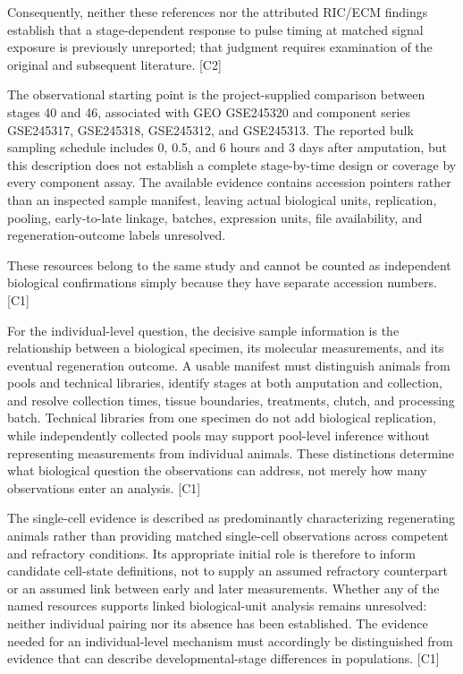 \documentclass[11pt]{article}
\begin{document}
Consequently, neither these references nor the attributed RIC/ECM findings establish that a stage-dependent response to pulse timing at matched signal exposure is previously unreported; that judgment requires examination of the original and subsequent literature. [C2]

The observational starting point is the project-supplied comparison between stages 40 and 46, associated with GEO GSE245320 and component series GSE245317, GSE245318, GSE245312, and GSE245313. The reported bulk sampling schedule includes 0, 0.5, and 6 hours and 3 days after amputation, but this description does not establish a complete stage-by-time design or coverage by every component assay. The available evidence contains accession pointers rather than an inspected sample manifest, leaving actual biological units, replication, pooling, early-to-late linkage, batches, expression units, file availability, and regeneration-outcome labels unresolved.

These resources belong to the same study and cannot be counted as independent biological confirmations simply because they have separate accession numbers. [C1]

For the individual-level question, the decisive sample information is the relationship between a biological specimen, its molecular measurements, and its eventual regeneration outcome. A usable manifest must distinguish animals from pools and technical libraries, identify stages at both amputation and collection, and resolve collection times, tissue boundaries, treatments, clutch, and processing batch. Technical libraries from one specimen do not add biological replication, while independently collected pools may support pool-level inference without representing measurements from individual animals. These distinctions determine what biological question the observations can address, not merely how many observations enter an analysis. [C1]

The single-cell evidence is described as predominantly characterizing regenerating animals rather than providing matched single-cell observations across competent and refractory conditions. Its appropriate initial role is therefore to inform candidate cell-state definitions, not to supply an assumed refractory counterpart or an assumed link between early and later measurements. Whether any of the named resources supports linked biological-unit analysis remains unresolved: neither individual pairing nor its absence has been established. The evidence needed for an individual-level mechanism must accordingly be distinguished from evidence that can describe developmental-stage differences in populations. [C1]
\end{document}
